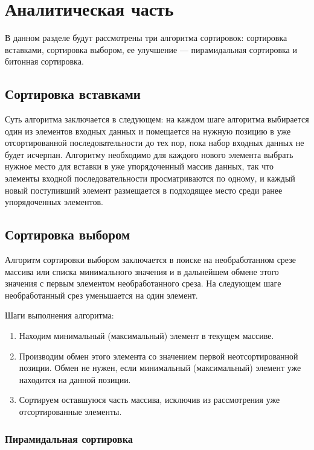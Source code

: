 \chapter{Аналитическая часть}
В данном разделе будут рассмотрены три алгоритма сортировок: сортировка вставками, сортировка выбором, ее улучшение --- пирамидальная сортировка и битонная сортировка.
\section{Сортировка вставками}

Суть алгоритма заключается в следующем: на каждом  шаге  алгоритма  выбирается один  из  элементов входных данных и  помещается  на нужную  позицию  в  уже  отсортированной последовательности до тех  пор,  пока  набор  входных  данных  не будет  исчерпан.
Алгоритму  необходимо  для  каждого нового  элемента  выбрать нужное место для вставки в уже упорядоченный массив данных, так что элементы  входной  последовательности просматриваются  по одному,  и каждый новый поступивший элемент размещается  в  подходящее  место среди  ранее  упорядоченных  элементов.

\section{Сортировка выбором}

Алгоритм сортировки выбором заключается в поиске на необработанном срезе массива или списка минимального значения и в дальнейшем обмене этого значения с первым элементом необработанного среза. На следующем шаге необработанный срез уменьшается на один элемент.

Шаги выполнения алгоритма:
\begin{enumerate}
	\item Находим  минимальный (максимальный)  элемент  в  текущем  массиве.
	\item Производим обмен этого элемента со значением первой неотсортированной позиции.  Обмен  не  нужен,  если минимальный (максимальный) элемент уже находится на данной позиции.
	\item Сортируем оставшуюся часть массива, исключив из рассмотрения уже отсортированные элементы.
\end{enumerate}

\subsection{Пирамидальная сортировка}

